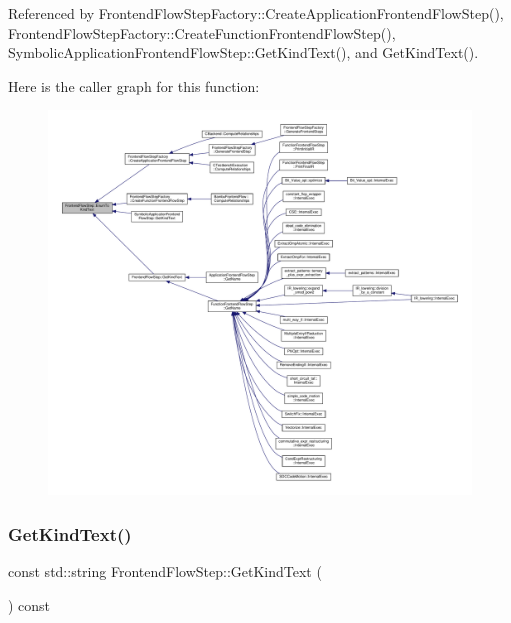 Referenced by Frontend\+Flow\+Step\+Factory\+::\+Create\+Application\+Frontend\+Flow\+Step(), Frontend\+Flow\+Step\+Factory\+::\+Create\+Function\+Frontend\+Flow\+Step(), Symbolic\+Application\+Frontend\+Flow\+Step\+::\+Get\+Kind\+Text(), and Get\+Kind\+Text().

Here is the caller graph for this function\+:
\nopagebreak
\begin{figure}[H]
\begin{center}
\leavevmode
\includegraphics[width=350pt]{d9/d37/classFrontendFlowStep_ad2069034c4947a128d22f73cf40e17e0_icgraph}
\end{center}
\end{figure}
\mbox{\label{classFrontendFlowStep_a264285918b0d8ea193eb1c2f3af17ef4}} 
\subsubsection{\texorpdfstring{Get\+Kind\+Text()}{GetKindText()}}
{\footnotesize\ttfamily const std\+::string Frontend\+Flow\+Step\+::\+Get\+Kind\+Text (\begin{DoxyParamCaption}{ }\end{DoxyParamCaption}) const\hspace{0.3cm}{\ttfamily [virtual]}}




